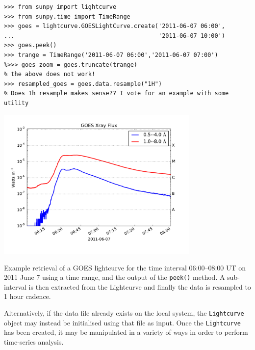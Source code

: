 \begin{listing}[H]
\begin{verbatim}
>>> from sunpy import lightcurve
>>> from sunpy.time import TimeRange
>>> goes = lightcurve.GOESLightCurve.create('2011-06-07 06:00',
...                                         '2011-06-07 10:00')
>>> goes.peek()
>>> trange = TimeRange('2011-06-07 06:00','2011-06-07 07:00')
%>>> goes_zoom = goes.truncate(trange)
% the above does not work!
>>> resampled_goes = goes.data.resample("1H")
% Does 1h resample makes sense?? I vote for an example with some utility
\end{verbatim}
\begin{center}
\includegraphics[width=10cm]{goes_lightcurve.pdf}
\end{center}
\caption{Example retrieval of a GOES lightcurve for the time interval 06:00--08:00 UT on 
2011 June 7 using a time range, and the output of the \texttt{peek()} method.
A sub-interval is then extracted from the Lightcurve and finally the data is resampled
to 1 hour cadence.}
\label{code:goes_lc}
\end{listing}

Alternatively, if the data file already exists on the local system, the 
\texttt{Lightcurve} object may instead be initialised using that file as input.
Once the \texttt{Lightcurve} has been created, it may be manipulated in 
a variety of ways in order to perform time-series analysis.
